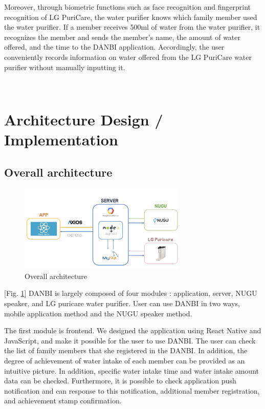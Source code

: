 \documentclass[conference]{IEEEtran}
\begin{document}
Moreover, through biometric functions such as face recognition and fingerprint recognition of LG PuriCare, the water purifier knows which family member used the water purifier. If a member receives 500ml of water from the water purifier, it recognizes the member and sends the member's name, the amount of water offered, and the time to the DANBI application. Accordingly, the user conveniently records information on water offered from the LG PuriCare water purifier without manually inputting it.

\ 

\section{Architecture Design / Implementation}

\subsection{Overall architecture}\label{AA}
\setlength{\parindent}{2ex}
\par \begin{figure}[h!]
\includegraphics[width=8cm]{image/architecture.png}
\centering
\caption{Overall architecture}
\label{fig:architecture}
\end{figure}

[Fig. \ref{fig:architecture}] DANBI is largely composed of four modules : application, server, NUGU speaker, and LG puricare water purifier. User can use DANBI in two ways, mobile application method and the NUGU speaker method.

The first module is frontend. We designed the application using React Native and JavaScript, and make it possible for the user to use DANBI. The user can check the list of family members that she registered in the DANBI. In addition, the degree of achievement of water intake of each member can be provided as an intuitive picture. In addition, specific water intake time and water intake amount data can be checked. Furthermore, it is possible to check application push notification and can response to this notification, additional member registration, and achievement stamp confirmation.
\end{document}
